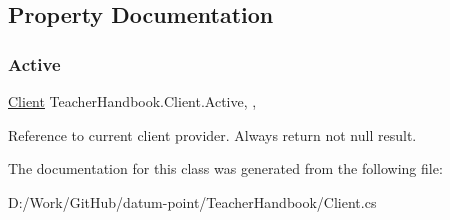 \subsection{Property Documentation}
\mbox{\label{class_teacher_handbook_1_1_client_a403583a80a8d5040410c4f1f180aafad}} 
\subsubsection{\texorpdfstring{Active}{Active}}
{\footnotesize\ttfamily \mbox{\hyperlink{class_teacher_handbook_1_1_client}{Client}} Teacher\+Handbook.\+Client.\+Active\hspace{0.3cm}{\ttfamily [static]}, {\ttfamily [get]}, {}}



Reference to current client provider. Always return not null result. 



The documentation for this class was generated from the following file\+:\begin{DoxyCompactItemize}
\item 
D\+:/\+Work/\+Git\+Hub/datum-\/point/\+Teacher\+Handbook/Client.\+cs\end{DoxyCompactItemize}
